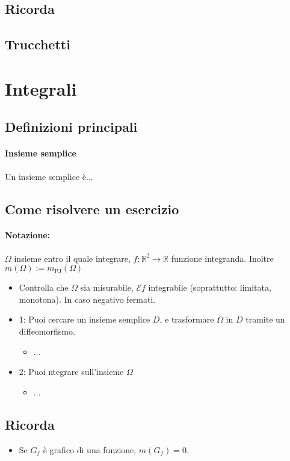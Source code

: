 \documentclass[a4paper,10pt]{book}
\begin{document}
\subsection{Ricorda}
\subsection{Trucchetti}

\section{Integrali}
\subsection{Definizioni principali}

\paragraph{Insieme semplice}
Un insieme semplice è...

\subsection{Come risolvere un esercizio}
\paragraph{Notazione:}
$\Omega$ insieme entro il quale integrare, $f:\mathbb{R}^2\rightarrow\mathbb{R}$ funzione integranda.
Inoltre $m(\Omega) := m_{\mathrm{PJ}}(\Omega)$
\begin{itemize}
 \item Controlla che $\Omega$ sia misurabile, $\mathcal{E}f$ integrabile (soprattutto: limitata, monotona). In caso negativo fermati.
 \item 1: Puoi cercare un insieme semplice $D$, e trasformare $\Omega$ in $D$ tramite un diffeomorfismo.
 \begin{itemize}
  \item ...
 \end{itemize}
 \item 2: Puoi ntegrare sull'insieme $\Omega$
 \begin{itemize}
  \item ...
 \end{itemize}
\end{itemize}

\subsection{Ricorda}
\begin{itemize}
 \item Se $G_f$ è grafico di una funzione, $m(G_f) = 0$.
\end{itemize}
\end{document}
